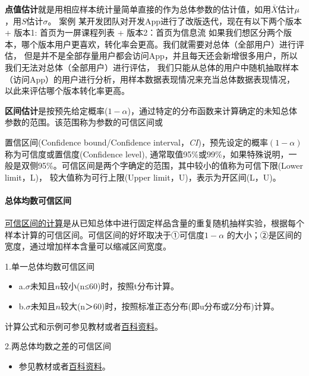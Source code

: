 \documentclass[
]{article}
\providecommand{\tightlist}{%
  \setlength{\itemsep}{0pt}\setlength{\parskip}{0pt}}
\begin{document}
\textbf{点值估计}就是用相应样本统计量简单直接的作为总体参数的估计值，如用\(\bar{X}\)估计\(μ\)，用\(S\)估计\(\sigma\)。
案例 某开发团队对开发App进行了改版迭代，现在有以下两个版本
+ 版本1: 首页为一屏课程列表
+ 版本2：首页为信息流
如果我们想区分两个版本，哪个版本用户更喜欢，转化率会更高。我们就需要对总体（全部用户）进行评估，
但是并不是全部存量用户都会访问App，并且每天还会新增很多用户，所以我们无法对总体（全部用户）进行评估，
我们只能从总体的用户中随机抽取样本（访问App）的用户进行分析，用样本数据表现情况来充当总体数据表现情况，
以此来评估哪个版本转化率更高。

\textbf{区间估计}是按预先给定概率(\(1-\alpha\))，通过特定的分布函数来计算确定的未知总体参数的范围。该范围称为参数的可信区间或

置信区间(Confidence bound/Confidence interval，\emph{CI})，预先设定的概率\((1-\alpha)\)称为可信度或置信度(Confidence level),
通常取值95\%或99\%，如果特殊说明，一般是双侧95\%。可信区间是两个字确定的范围，其中较小的值称为可信下限(Lower limit，L)，
较大值称为可行上限(Upper limit，U)，表示为开区间(L，U)。

\hypertarget{ux603bux4f53ux5747ux6570ux53efux4fe1ux533aux95f4}{%
\paragraph{总体均数可信区间}\label{ux603bux4f53ux5747ux6570ux53efux4fe1ux533aux95f4}}

\href{https://zh.wikipedia.org/wiki/\%E7\%BD\%AE\%E4\%BF\%A1\%E5\%8C\%BA\%E9\%97\%B4}{可信区间的计算}是从已知总体中进行固定样品含量的重复随机抽样实验，根据每个样本计算的可信区间。可信区间的好坏取决于①可信度\(1-\alpha\)
的大小；②是区间的宽度，通过增加样本含量可以缩减区间宽度。

1.单一总体均数可信区间

\begin{itemize}
\item
  a.\(\sigma\)未知且\(n\)较小(n≤60)时，按照t分布计算。
\item
  b.\(\sigma\)未知且\(n\)较大(n＞60)时，按照标准正态分布(即u分布或Z分布)计算。
\end{itemize}

计算公式和示例可参见教材或者\href{https://zh.wikipedia.org/wiki/\%E7\%BD\%AE\%E4\%BF\%A1\%E5\%8C\%BA\%E9\%97\%B4}{百科资料}。

2.两总体均数之差的可信区间

\begin{itemize}
\tightlist
\item
  参见教材或者\href{https://zh.wikipedia.org/wiki/\%E7\%BD\%AE\%E4\%BF\%A1\%E5\%8C\%BA\%E9\%97\%B4}{百科资料}。
\end{itemize}
\end{document}
